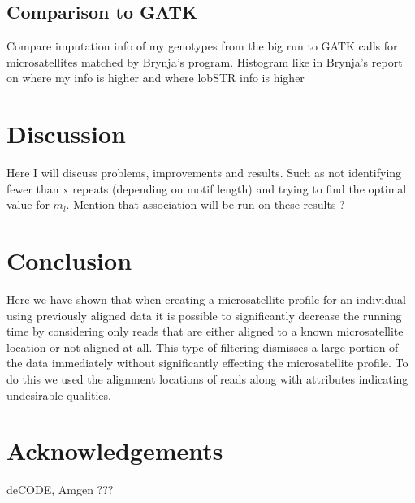 \documentclass{bioinfo}
\begin{document}
\subsection{Comparison to GATK}
Compare imputation info of my genotypes from the big run to GATK calls for microsatellites matched by Brynja's program.
Histogram like in Brynja's report on where my info is higher and where lobSTR info is higher

\section{Discussion}

Here I will discuss problems, improvements and results. Such as not identifying fewer than x repeats (depending on motif length) and trying to find the optimal value for $m_l$. Mention that association will be run on these results ? 









%
%






\section{Conclusion}
Here we have shown that when creating a microsatellite profile for an individual using previously aligned data it is possible to significantly decrease the running time by considering only reads that are either aligned to a known microsatellite location or not aligned at all. This type of filtering dismisses a large portion of the data immediately without significantly effecting the microsatellite profile. To do this we used the alignment locations of reads along with attributes indicating undesirable qualities.


\section*{Acknowledgements}
deCODE, Amgen ??? 

%
%
%
%
%
%


\end{document}
